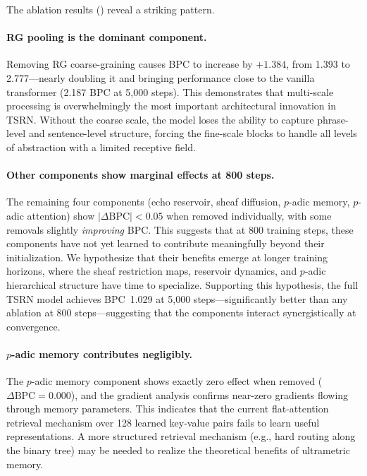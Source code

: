 \documentclass[11pt,a4paper]{article}
\begin{document}
The ablation results () reveal a striking pattern.

\paragraph{RG pooling is the dominant component.}
Removing RG coarse-graining causes BPC to increase by $+1.384$, from
1.393 to 2.777---nearly doubling it and bringing performance close to
the vanilla transformer (2.187 BPC at 5{,}000 steps).  This
demonstrates that multi-scale processing is overwhelmingly the most
important architectural innovation in TSRN.  Without the coarse scale,
the model loses the ability to capture phrase-level and sentence-level
structure, forcing the fine-scale blocks to handle all levels of
abstraction with a limited receptive field.

\paragraph{Other components show marginal effects at 800 steps.}
The remaining four components (echo reservoir, sheaf diffusion,
$p$-adic memory, $p$-adic attention) show $|\Delta\text{BPC}| < 0.05$
when removed individually, with some removals slightly
\emph{improving} BPC.  This suggests that at 800 training steps,
these components have not yet learned to contribute meaningfully
beyond their initialization.  We hypothesize that their benefits
emerge at longer training horizons, where the sheaf restriction maps,
reservoir dynamics, and $p$-adic hierarchical structure have time to
specialize.  Supporting this hypothesis, the full TSRN model achieves
BPC~1.029 at 5{,}000 steps---significantly better than any
ablation at 800 steps---suggesting that the components interact
synergistically at convergence.

\paragraph{$p$-adic memory contributes negligibly.}
The $p$-adic memory component shows exactly zero effect when removed
($\Delta\text{BPC} = 0.000$), and the gradient analysis confirms
near-zero gradients flowing through memory parameters.  This
indicates that the current flat-attention retrieval mechanism over 128
learned key-value pairs fails to learn useful representations.  A
more structured retrieval mechanism (e.g., hard routing along the
binary tree) may be needed to realize the theoretical benefits of
ultrametric memory.
\end{document}
